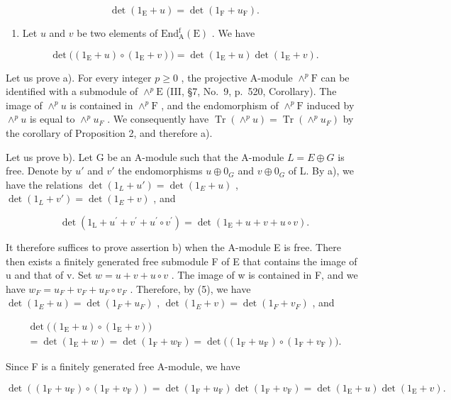 \[
\det (1 _ {\mathrm{E}} + u) = \det (1 _ {\mathrm{F}} + u _ {\mathrm{F}}).\tag{5}
\]

\begin{enumerate}
\def\labelenumi{\alph{enumi})}
\setcounter{enumi}{1}
\tightlist
\item
  Let \(u\) and \(v\) be two elements of \(\mathrm{End}_{\mathrm{A}}^{\mathrm{f}}(\mathrm{E})\) . We have
\end{enumerate}

\[
\det \bigl ((1 _ {\mathrm{E}} + u) \circ (1 _ {\mathrm{E}} + v) \bigr) = \det (1 _ {\mathrm{E}} + u) \det (1 _ {\mathrm{E}} + v).\tag{6}
\]

Let us prove a). For every integer \(p \geqslant 0\) , the projective A-module \(\wedge^p\mathrm{F}\) can be identified with a submodule of \(\wedge^p\mathrm{E}\) (III, §7, No.~9, p.~520, Corollary). The image of \(\wedge^p u\) is contained in \(\wedge^p\mathrm{F}\) , and the endomorphism of \(\wedge^p\mathrm{F}\) induced by \(\wedge^{p}u\) is equal to \(\wedge^{p}u_{F}\) . We consequently have \(\operatorname{Tr}(\wedge^{p}u)=\operatorname{Tr}(\wedge^{p}u_{F})\) by the corollary of Proposition 2, and therefore a).

Let us prove b). Let G be an A-module such that the A-module \(L = E \oplus G\) is free. Denote by \(u'\) and \(v'\) the endomorphisms \(u \oplus 0_{G}\) and \(v \oplus 0_{G}\) of L. By a), we have the relations \(\det(1_{L} + u') = \det(1_{E} + u)\) , \(\det(1_{L} + v') = \det(1_{E} + v)\) , and

\[
\det (1 _ {\mathrm{L}} + u ^ {\prime} + v ^ {\prime} + u ^ {\prime} \circ v ^ {\prime}) = \det (1 _ {\mathrm{E}} + u + v + u \circ v).
\]

It therefore suffices to prove assertion b) when the A-module E is free. There then exists a finitely generated free submodule F of E that contains the image of u and that of v. Set \(w = u + v + u \circ v\) . The image of w is contained in F, and we have \(w_{F} = u_{F} + v_{F} + u_{F} \circ v_{F}\) . Therefore, by (5), we have \(\det(1_{E} + u) = \det(1_{F} + u_{F})\) , \(\det(1_{E} + v) = \det(1_{F} + v_{F})\) , and

\[
\begin{array}{c} \det \bigl ((1 _ {\mathrm{E}} + u) \circ (1 _ {\mathrm{E}} + v) \bigr) \\ = \det (1 _ {\mathrm{E}} + w) = \det (1 _ {\mathrm{F}} + w _ {\mathrm{F}}) = \det \bigl ((1 _ {\mathrm{F}} + u _ {\mathrm{F}}) \circ (1 _ {\mathrm{F}} + v _ {\mathrm{F}}) \bigr). \end{array}
\]

Since F is a finitely generated free A-module, we have

\[
\det \left(\left(1 _ {\mathrm{F}} + u _ {\mathrm{F}}\right) \circ \left(1 _ {\mathrm{F}} + v _ {\mathrm{F}}\right)\right) = \det \left(1 _ {\mathrm{F}} + u _ {\mathrm{F}}\right) \det \left(1 _ {\mathrm{F}} + v _ {\mathrm{F}}\right) = \det \left(1 _ {\mathrm{E}} + u\right) \det \left(1 _ {\mathrm{E}} + v\right).
\]

